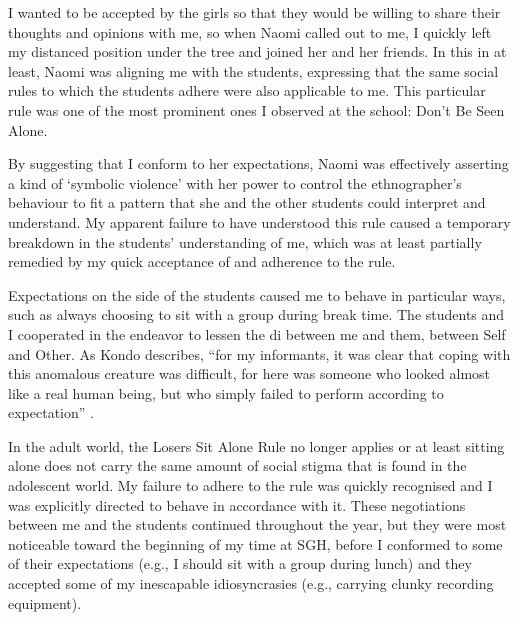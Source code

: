I wanted to be accepted by the girls so that they would be willing to share their thoughts and opinions with me, so when Naomi called out to me, I quickly left my distanced position under the tree and joined her and her friends. In this in at least, Naomi was aligning me with the students, expressing that the same social rules to which the students adhere were also applicable to me. This particular rule was one of the most prominent ones I observed at the school: Don't Be Seen Alone. 

By suggesting that I conform to her expectations, Naomi was effectively asserting a kind of `symbolic violence' \citep[130]{rabinow1977} with her power to control the ethnographer's behaviour to fit a pattern that she and the other students could interpret and understand. My apparent failure to have understood this rule caused a temporary breakdown in the students' understanding of me, which was at least partially remedied by my quick acceptance of and adherence to the rule.
\nocite{rabinow1977} 

Expectations on the side of the students caused me to behave in particular ways, such as always choosing to sit with a group during break time. The students and I cooperated in the endeavor to lessen the di between me and them, between Self and Other. As Kondo describes,	``for my informants, it was clear that coping with this anomalous creature was difficult, for here was someone who looked almost like a real human being, but who simply failed to perform according to expectation'' \citep[76]{kondo1986}.

In the adult world, the Losers Sit Alone Rule no longer applies or at least sitting alone does not carry the same amount of social stigma that is found in the adolescent world. My failure to adhere to the rule was quickly recognised and I was explicitly directed to behave in accordance with it. These negotiations between me and the students continued throughout the year, but they were most noticeable toward the beginning of my time at SGH, before I conformed to some of their expectations (e.g., I should sit with a group during lunch) and they accepted some of my inescapable idiosyncrasies (e.g., carrying clunky recording equipment).
\nocite{kondo1986}


